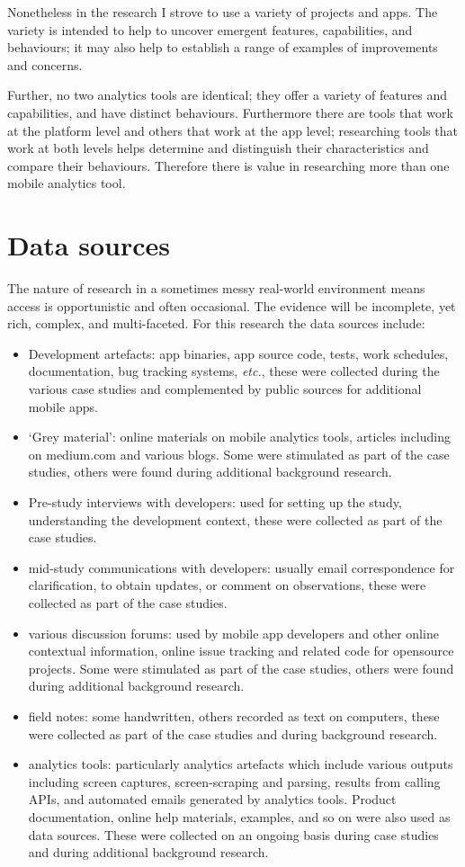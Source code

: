 Nonetheless in the research I strove to use a variety of projects and apps. The variety is intended to help to uncover emergent features, capabilities, and behaviours; it may also help to establish a range of examples of improvements and concerns. 

Further, no two analytics tools are identical; they offer a variety of features and capabilities, and have distinct behaviours.  Furthermore there are tools that work at the platform level and others that work at the app level; researching tools that work at both levels helps determine and distinguish their characteristics and compare their behaviours. Therefore there is value in researching more than one mobile analytics tool.

\section{Data sources}
The nature of research in a sometimes messy real-world environment means access is opportunistic and often occasional. The evidence will be incomplete, yet rich, complex, and multi-faceted. For this research the data sources include:

\begin{itemize}
    \itemsep0em
    \item Development artefacts: app binaries, app source code, tests, work schedules, documentation, bug tracking systems, \textit{etc.}, these were collected during the various case studies and complemented by public sources for additional mobile apps.
    \item `Grey material': online materials on mobile analytics tools, articles including on medium.com and various blogs. Some were stimulated as part of the case studies, others were found during additional background research.
    \item Pre-study interviews with developers: used for setting up the study, understanding the development context, these were collected as part of the case studies.
    \item mid-study communications with developers: usually email correspondence for clarification, to obtain updates, or comment on observations, these were collected as part of the case studies.
    \item various discussion forums: used by mobile app developers and other online contextual information, online issue tracking and related code for opensource projects. Some were stimulated as part of the case studies, others were found during additional background research.
    \item field notes: some handwritten, others recorded as text on computers, these were collected as part of the case studies and during background research.
    \item analytics tools: particularly analytics artefacts which include various outputs including screen captures, screen-scraping and parsing, results from calling APIs, and automated emails generated by analytics tools. Product documentation, online help materials, examples, and so on were also used as data sources. These were collected on an ongoing basis during case studies and during additional background research.
\end{itemize}

